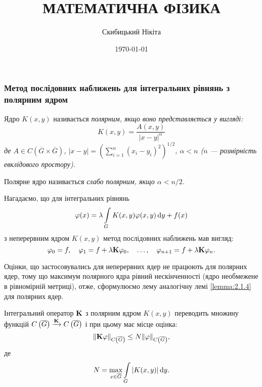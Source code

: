 

\title{{\Huge МАТЕМАТИЧНА ФІЗИКА}}
\author{Скибицький Нікіта}
\date{\today}





\tableofcontents

\setcounter{section}{2}
\setcounter{subsection}{1}
\setcounter{subsubsection}{4}
\setcounter{theorem}{20}
\setcounter{equation}{39}

\subsubsection{Метод послідовних наближень для інтегральних рівнянь з полярним ядром}

\begin{definition}
	Ядро $K(x, y)$ називається \it{полярним}, якщо воно представляється у вигляді:
	\begin{equation}
		K(x, y) = \dfrac{A(x, y)}{|x - y|^\alpha}
	\end{equation}
	де $A \in C\left(\overline G \times \overline G\right)$, $|x - y| = \left( \sum_{i = 1}^n (x_i - y_i)^2 \right)^{1/2}$, $\alpha < n$ ($n$ --- розмірність евклідового простору).
\end{definition}

\begin{definition}
	Полярне ядро називається \it{слабо полярним}, якщо $\alpha < n / 2$.
\end{definition}

Нагадаємо, що для інтегральних рівнянь 
\begin{equation}
	\phi(x) = \lambda \Int_G K(x, y) \phi(x, y) \diff y + f(x)
\end{equation}
з неперервним ядром $K(x, y)$ метод послідовних наближень мав вигляд: 
\begin{equation}
	\phi_0 = f, \quad \phi_1 = f + \lambda \bf{K} \phi_0, \quad \ldots, \quad \phi_{n + 1} = f + \lambda \bf{K} \phi_n.
\end{equation}	

Оцінки, що застосовувались для неперервних ядер не працюють для полярних ядер, тому що максимум полярного ядра рівний нескінченності (ядро необмежене в рівномірній метриці), отже, сформулюємо лему аналогічну лемі \ref{lemma:2.1.4} для полярних ядер. 

\begin{lemma}
	Інтегральний оператор $\bf{K}$ з полярним ядром $K(x, y)$ переводить множину функцій $C\left(\overline G\right) \xrightarrow{\bf{K}} C \left(\overline G\right)$ і при цьому має місце оцінка: 
	\begin{equation}
		\| \bf{K} \phi \|_{C\left(\overline G\right)} \le N \| \phi\|_{C\left(\overline G\right)},
	\end{equation}
	де 
	\begin{equation}
		N = \Max_{x \in \overline G} \Int_G |K(x, y)| \diff y.
	\end{equation}
\end{lemma}

